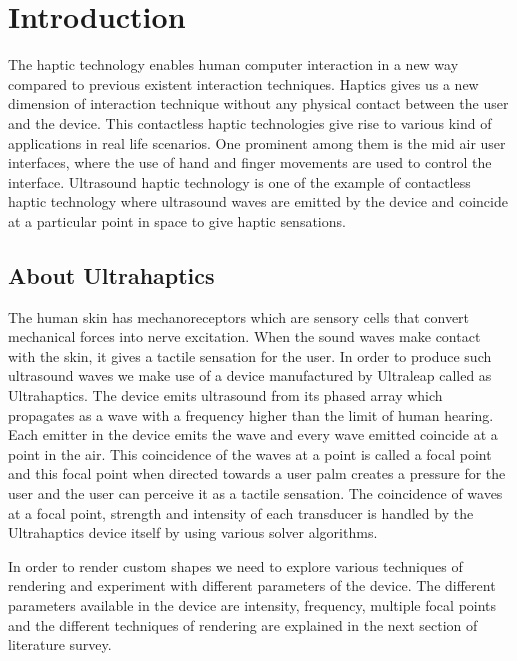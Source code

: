 %
\chapter{Introduction}
\label{sec:intro}

The haptic technology enables human computer interaction in a new way compared to previous existent interaction techniques. Haptics gives us a new dimension of interaction technique without any physical contact between the user and the device. This contactless haptic technologies give rise to various kind of applications in real life scenarios. One prominent among them is the mid air user interfaces, where the use of hand and finger movements are used to control the interface. Ultrasound haptic technology \cite{iwamoto2008non} is one of the example of contactless haptic technology where ultrasound waves are emitted by the device and coincide at a particular point in space to give haptic sensations. 


\section{About Ultrahaptics}
\label{sec:intro:about ultrahaptics}


The human skin has mechanoreceptors which are sensory cells that convert mechanical forces into nerve excitation. When the sound waves make contact with the skin, it gives a tactile sensation for the user. In order to produce such ultrasound waves we make use of a device manufactured by Ultraleap \cite{ul} called as Ultrahaptics.	The device emits ultrasound from its phased array which propagates as a wave with a frequency higher than the limit of human hearing. Each emitter in the device emits the wave and every wave emitted coincide at a point in the air. This coincidence of the waves at a point is called a focal point and this focal point when directed towards a user palm creates a pressure for the user and the user can perceive it as a tactile sensation. The coincidence of waves at a focal point, strength and intensity of each transducer is handled by the Ultrahaptics device itself by using various solver algorithms.

In order to render custom shapes we need to explore various techniques of rendering and experiment with different parameters of the device. The different parameters available in the device are intensity, frequency, multiple focal points and the different techniques of rendering are explained in the next section of literature survey. 

